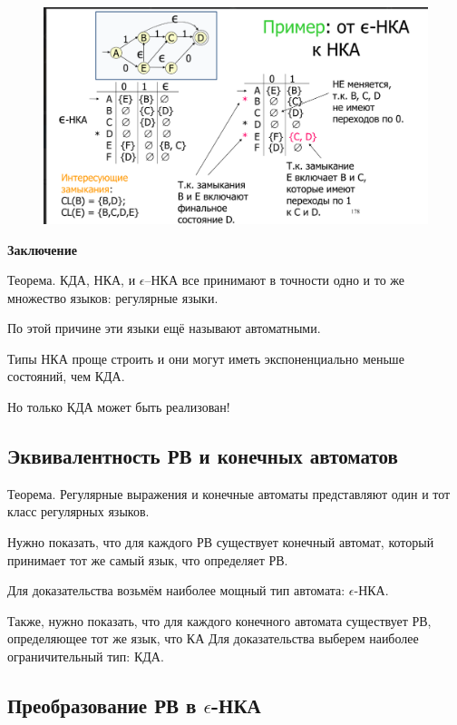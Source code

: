 \documentclass{article}
\begin{document}
\begin{figure}[H]
    \centering
    \includegraphics[width=1\linewidth]{Снимок экрана 2025-03-20 083857.png}
\end{figure}



\textbf{Заключение}

Теорема. КДА, НКА, и $\epsilon$–НКА все принимают в точности
одно и то же множество языков: регулярные языки.

По этой причине эти языки ещё называют автоматными.

Типы НКА проще строить и они могут иметь
экспоненциально меньше состояний, чем КДА.

Но только КДА может быть реализован!

\subsection{Эквивалентность РВ и конечных автоматов}

Теорема. Регулярные выражения и конечные автоматы
представляют один и тот класс регулярных языков.

Нужно показать, что для каждого РВ существует конечный
автомат, который принимает тот же самый язык, что
определяет РВ.

Для доказательства возьмём наиболее мощный тип
автомата: $\epsilon$-НКА.

Также, нужно показать, что для каждого конечного автомата
существует РВ, определяющее тот же язык, что КА
Для доказательства выберем наиболее ограничительный
тип: КДА.


\subsection{Преобразование РВ в $\epsilon$-НКА}
\end{document}

